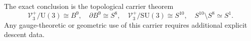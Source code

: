 The exact conclusion is the topological carrier theorem
\begin{equation}
 \boxed{
 \mathscr V_3^+/\mathrm U(3)\cong B^9,\quad
 \partial B^9\cong S^8,\quad
 \mathscr V_3^+/\mathrm{SU}(3)\cong S^{10},\quad
 S^{10}\setminus S^8\simeq S^1.
 }
 \label{eq:hr3c-final-carrier}
\end{equation}
Any gauge-theoretic or geometric use of this carrier requires additional
explicit descent data.
